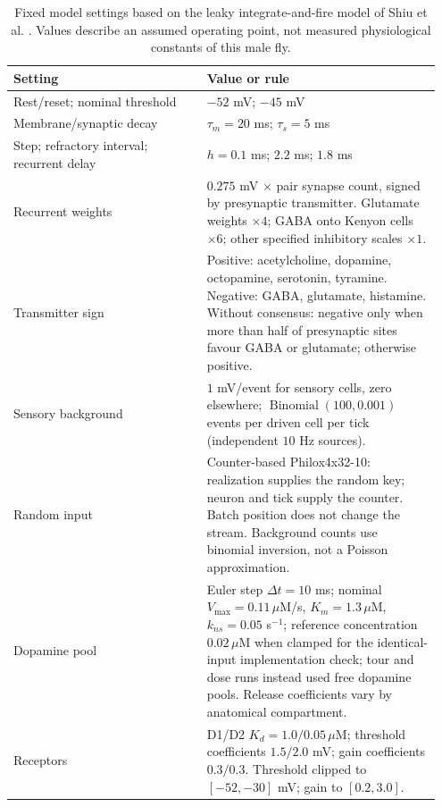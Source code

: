 \documentclass[11pt]{article}
\begin{document}
\begin{table}[htbp]
\caption{Fixed model settings based on the leaky integrate-and-fire model of Shiu et al. \cite{shiu}. Values describe an assumed operating point, not measured physiological constants of this male fly.}
\small\begin{tabular}{@{}p{0.43\linewidth}p{0.52\linewidth}@{}}\toprule
Setting & Value or rule \\ \midrule
Rest/reset; nominal threshold & $-52$ mV; $-45$ mV \\
Membrane/synaptic decay & $\tau_m=20$ ms; $\tau_s=5$ ms \\
Step; refractory interval; recurrent delay & $h=0.1$ ms; $2.2$ ms; $1.8$ ms \\
Recurrent weights & $0.275$ mV $\times$ pair synapse count, signed by presynaptic transmitter. Glutamate weights $\times 4$; GABA onto Kenyon cells $\times 6$; other specified inhibitory scales $\times 1$. \\
Transmitter sign & Positive: acetylcholine, dopamine, octopamine, serotonin, tyramine. Negative: GABA, glutamate, histamine. Without consensus: negative only when more than half of presynaptic sites favour GABA or glutamate; otherwise positive. \\
Sensory background & $1$ mV/event for sensory cells, zero elsewhere; $\operatorname{Binomial}(100,0.001)$ events per driven cell per tick (independent $10$ Hz sources). \\
Random input & Counter-based Philox4x32-10: realization supplies the random key; neuron and tick supply the counter. Batch position does not change the stream. Background counts use binomial inversion, not a Poisson approximation. \\
Dopamine pool & Euler step $\Delta t=10$ ms; nominal $V_{\max}=0.11\,\mu$M/s, $K_m=1.3\,\mu$M, $k_{ns}=0.05$ s$^{-1}$; reference concentration $0.02\,\mu$M when clamped for the identical-input implementation check; tour and dose runs instead used free dopamine pools. Release coefficients vary by anatomical compartment. \\
Receptors & D1/D2 $K_d=1.0/0.05\,\mu$M; threshold coefficients $1.5/2.0$ mV; gain coefficients $0.3/0.3$. Threshold clipped to $[-52,-30]$ mV; gain to $[0.2,3.0]$. \\
\bottomrule\end{tabular}
\end{table}
\end{document}
